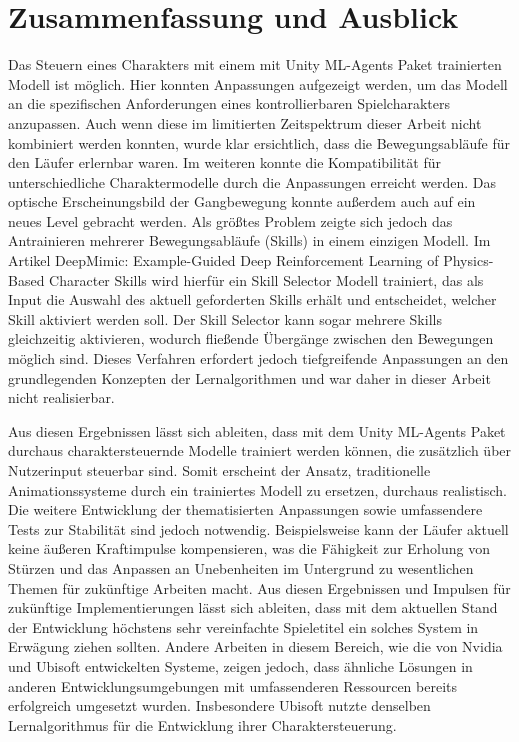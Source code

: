 {\chapter{Zusammenfassung und Ausblick}}
\label{sec:zusammenfassung_ausblick}
Das Steuern eines Charakters mit einem mit Unity ML-Agents Paket trainierten Modell ist möglich. Hier konnten Anpassungen aufgezeigt werden, um das Modell an die spezifischen Anforderungen eines kontrollierbaren Spielcharakters anzupassen. Auch wenn diese im limitierten Zeitspektrum dieser Arbeit nicht kombiniert werden konnten, wurde klar ersichtlich, dass die Bewegungsabläufe für den Läufer erlernbar waren. Im weiteren konnte die Kompatibilität für unterschiedliche Charaktermodelle durch die Anpassungen erreicht werden. Das optische Erscheinungsbild der Gangbewegung konnte außerdem auch auf ein neues Level gebracht werden. Als größtes Problem zeigte sich jedoch das Antrainieren mehrerer Bewegungsabläufe (Skills) in einem einzigen Modell. Im Artikel \grqq{}DeepMimic: Example-Guided Deep Reinforcement Learning of Physics-Based Character Skills\grqq{} wird hierfür ein Skill Selector Modell trainiert, das als Input die Auswahl des aktuell geforderten Skills erhält und entscheidet, welcher Skill aktiviert werden soll. Der Skill Selector kann sogar mehrere Skills gleichzeitig aktivieren, wodurch fließende Übergänge zwischen den Bewegungen möglich sind.\cite{peng2018deepmimic} Dieses Verfahren erfordert jedoch tiefgreifende Anpassungen an den grundlegenden Konzepten der Lernalgorithmen und war daher in dieser Arbeit nicht realisierbar.

Aus diesen Ergebnissen lässt sich ableiten, dass mit dem Unity ML-Agents Paket durchaus charaktersteuernde Modelle trainiert werden können, die zusätzlich über Nutzerinput steuerbar sind. Somit erscheint der Ansatz, traditionelle Animationssysteme durch ein trainiertes Modell zu ersetzen, durchaus realistisch. Die weitere Entwicklung der thematisierten Anpassungen sowie umfassendere Tests zur Stabilität sind jedoch notwendig. Beispielsweise kann der Läufer aktuell keine äußeren Kraftimpulse kompensieren, was die Fähigkeit zur Erholung von Stürzen und das Anpassen an Unebenheiten im Untergrund zu wesentlichen Themen für zukünftige Arbeiten macht. Aus diesen Ergebnissen und Impulsen für zukünftige Implementierungen lässt sich ableiten, dass mit dem aktuellen Stand der Entwicklung höchstens sehr vereinfachte Spieletitel ein solches System in Erwägung ziehen sollten. Andere Arbeiten in diesem Bereich, wie die von Nvidia und Ubisoft entwickelten Systeme, zeigen jedoch, dass ähnliche Lösungen in anderen Entwicklungsumgebungen mit umfassenderen Ressourcen bereits erfolgreich umgesetzt wurden.\cite{2022-TOG-ASE}\cite{10.1145/3355089.3356536} Insbesondere Ubisoft nutzte denselben Lernalgorithmus für die Entwicklung ihrer Charaktersteuerung.

